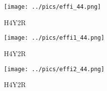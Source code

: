 \documentclass[10pt, xcolor={dvipsnames}, aspectratio = 169]{beamer}
\begin{document}
\begin{frame}

\begin{figure}
\centering
\texttt{[image: ../pics/effi\_44.png]}
\caption{H4Y2R}
\end{figure}

\end{frame}

\begin{frame}

\begin{figure}
\centering
\texttt{[image: ../pics/effi1\_44.png]}
\caption{H4Y2R}
\end{figure}

\end{frame}

\begin{frame}

\begin{figure}
\centering
\texttt{[image: ../pics/effi2\_44.png]}
\caption{H4Y2R}
\end{figure}

\end{frame}
\end{document}
